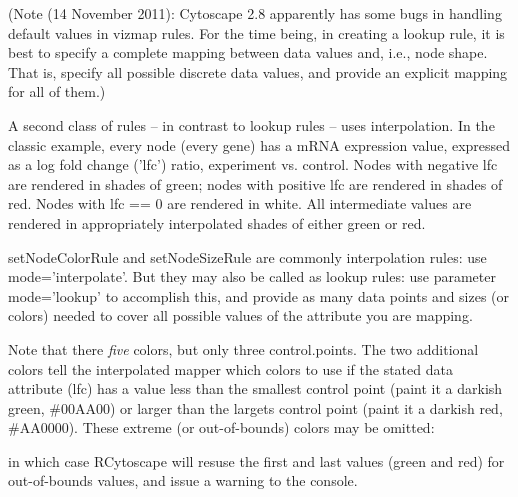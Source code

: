 \documentclass[12pt]{article}
\begin{document}
(Note (14 November 2011):  Cytoscape 2.8 apparently has some bugs in handling default values in vizmap rules.  For the time being, in creating a lookup rule, it is best to specify a complete mapping between data values and, i.e., node shape.  That is, specify all possible discrete data values, and provide an explicit mapping for all of them.)

A second class of rules -- in contrast to lookup rules -- uses interpolation.  In the classic example, every node (every gene) has a mRNA expression
value, expressed as a log fold change ('lfc') ratio, experiment vs. control.  Nodes with negative lfc are rendered in
shades of green; nodes with positive lfc are rendered in shades of red.  Nodes with lfc == 0 are rendered in white.  All
intermediate values are rendered in appropriately interpolated shades of either green or red.

setNodeColorRule and setNodeSizeRule are commonly interpolation rules: use mode='interpolate'.  But they may also be called as lookup rules:  use parameter mode='lookup' to accomplish this, and provide as many data points and sizes (or colors) needed to cover all possible values of the attribute you are mapping.

\begin{Schunk}
\end{Schunk}
Note that there \emph{five} colors, but only three control.points.  The two additional colors tell the interpolated mapper which colors to use if the stated data attribute (lfc) has a value less than the smallest control point (paint it a darkish green, \#00AA00) or larger than the largets control point (paint it a darkish red, \#AA0000).  These extreme (or out-of-bounds) colors may be omitted:

\begin{Schunk}
\end{Schunk}

in which case RCytoscape will resuse the first and last values (green and red) for out-of-bounds values, and issue a warning to the console.
\end{document}

